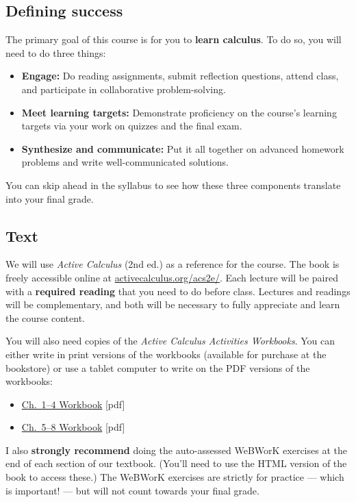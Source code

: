 \documentclass[11pt,twoside]{amsart}
\begin{document}
\subsection*{Defining success}
The primary goal of this course is for you to \textbf{learn calculus}. To do so, you will need to do three things:
\begin{itemize}
\item \textbf{Engage:} Do reading assignments, submit reflection questions, attend class, and participate in collaborative problem-solving.
\item \textbf{Meet learning targets:} Demonstrate proficiency on the course's learning targets via your work on quizzes and the final exam.
\item \textbf{Synthesize and communicate:} Put it all together on advanced homework problems and write well-communicated solutions.
\end{itemize}
You can skip ahead in the syllabus to see how these three components translate into your final grade.

\subsection*{Text}
We will use \emph{Active Calculus} (2nd ed.) as a reference for the course.  The book is freely accessible  online at \href{https://activecalculus.org/acs2e/}{activecalculus.org/acs2e/}.  Each lecture will be paired with a \textbf{required reading} that you need to do before class.  Lectures and readings will be complementary, and both will be necessary to fully appreciate and learn the course content.

You will also need copies of the \emph{Active Calculus Activities Workbooks}. You can either write in print versions of the workbooks (available for purchase at the bookstore) or use a tablet computer to write on the PDF versions of the workbooks:
\begin{itemize}
\item \href{https://activecalculus.org/wp-content/uploads/2024/08/acs-activity-workbook-14-2024.pdf}{Ch.~1--4 Workbook} [pdf]
\item \href{https://activecalculus.org/wp-content/uploads/2024/08/acs-activity-workbook-58-2024.pdf}{Ch.~5--8 Workbook} [pdf]
\end{itemize}

I also \textbf{strongly recommend} doing the auto-assessed WeBWorK exercises at the end of each section of our textbook. (You'll need to use the HTML version of the book to access these.) The WeBWorK exercises are strictly for practice --- which is important! --- but will not count towards your final grade.
\end{document}
